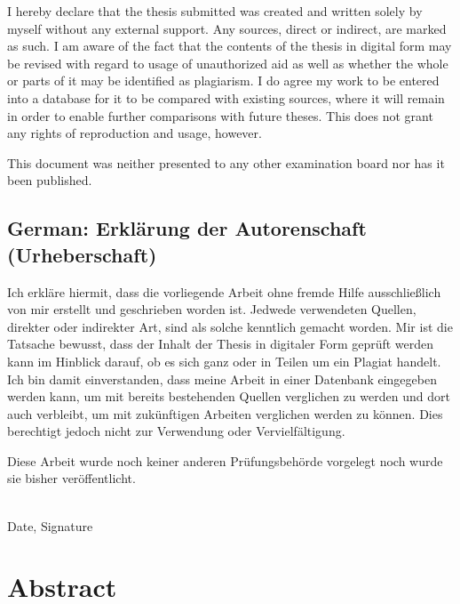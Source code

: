 \documentclass[a4paper,11pt,oneside]{article}
\begin{document}
I hereby declare that the thesis submitted was created and written
solely by myself without any external support. Any sources, direct
or indirect, are marked as such. I am aware of the fact that the
contents of the thesis in digital form may be revised with regard to
usage of unauthorized aid as well as whether the whole or parts of
it may be identified as plagiarism. I do agree my work to be entered
into a database for it to be compared with existing sources, where
it will remain in order to enable further comparisons with future
theses. This does not grant any rights of reproduction and usage,
however.

This document was neither presented to any other examination board
nor has it been published.

\subsection*{German: Erklärung der Autorenschaft (Urheberschaft)}

Ich erkläre hiermit, dass die vorliegende Arbeit ohne fremde Hilfe
ausschließlich von mir erstellt und geschrieben worden ist. Jedwede
verwendeten Quellen, direkter oder indirekter Art, sind als solche
kenntlich gemacht worden. Mir ist die Tatsache bewusst, dass der
Inhalt der Thesis in digitaler Form geprüft werden kann im Hinblick
darauf, ob es sich ganz oder in Teilen um ein Plagiat handelt. Ich
bin damit einverstanden, dass meine Arbeit in einer Datenbank
eingegeben werden kann, um mit bereits bestehenden Quellen
verglichen zu werden und dort auch verbleibt, um mit zukünftigen
Arbeiten verglichen werden zu können. Dies berechtigt jedoch nicht
zur Verwendung oder Vervielfältigung.

Diese Arbeit wurde noch keiner anderen Prüfungsbehörde vorgelegt
noch wurde sie bisher veröffentlicht.

\vspace{20mm}

\dotfill\\
Date, Signature

\newpage

\section*{Abstract}
\end{document}
